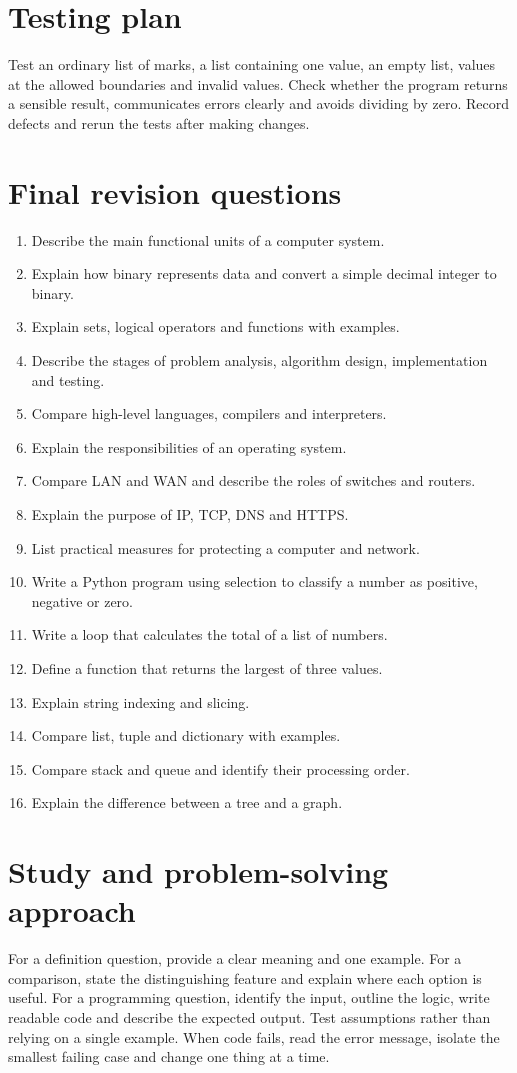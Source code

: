 \documentclass[11pt,openany,oneside]{book}
\begin{document}
\section{Testing plan}
Test an ordinary list of marks, a list containing one value, an empty list, values at the allowed boundaries and invalid values. Check whether the program returns a sensible result, communicates errors clearly and avoids dividing by zero. Record defects and rerun the tests after making changes.

\section{Final revision questions}
\begin{enumerate}
\item Describe the main functional units of a computer system.
\item Explain how binary represents data and convert a simple decimal integer to binary.
\item Explain sets, logical operators and functions with examples.
\item Describe the stages of problem analysis, algorithm design, implementation and testing.
\item Compare high-level languages, compilers and interpreters.
\item Explain the responsibilities of an operating system.
\item Compare LAN and WAN and describe the roles of switches and routers.
\item Explain the purpose of IP, TCP, DNS and HTTPS.
\item List practical measures for protecting a computer and network.
\item Write a Python program using selection to classify a number as positive, negative or zero.
\item Write a loop that calculates the total of a list of numbers.
\item Define a function that returns the largest of three values.
\item Explain string indexing and slicing.
\item Compare list, tuple and dictionary with examples.
\item Compare stack and queue and identify their processing order.
\item Explain the difference between a tree and a graph.
\end{enumerate}

\section{Study and problem-solving approach}
For a definition question, provide a clear meaning and one example. For a comparison, state the distinguishing feature and explain where each option is useful. For a programming question, identify the input, outline the logic, write readable code and describe the expected output. Test assumptions rather than relying on a single example. When code fails, read the error message, isolate the smallest failing case and change one thing at a time.
\end{document}
